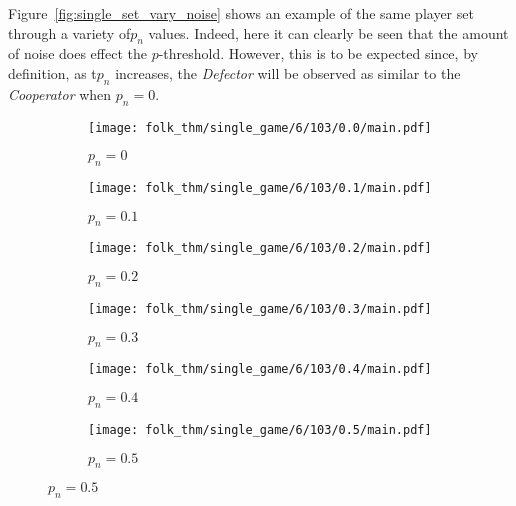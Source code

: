 Figure~\ref{fig:single_set_vary_noise} shows an example of the same player set
through a variety of\(p_{n}\) values. Indeed, here it can clearly be seen that
the amount of
noise does effect the \(p\)-threshold. However, this is to be expected since, by
definition, as t\(p_{n}\) increases, the \textit{Defector} will be observed
as similar to the \textit{Cooperator} when \(p_{n}=0\).

\begin{figure}
    \centering
    \begin{subfigure}{0.45\textwidth}
        \centering
        \texttt{[image: folk\_thm/single\_game/6/103/0.0/main.pdf]}
        \caption{\(p_{n}=0\)}
    \end{subfigure}
    \hspace{3pt}
    \begin{subfigure}{0.45\textwidth}
        \centering
        \texttt{[image: folk\_thm/single\_game/6/103/0.1/main.pdf]}
        \caption{\(p_{n}=0.1\)}
    \end{subfigure}

    \vspace{5pt}

    \begin{subfigure}{0.45\textwidth}
        \centering
        \texttt{[image: folk\_thm/single\_game/6/103/0.2/main.pdf]}
        \caption{\(p_{n}=0.2\)}
    \end{subfigure}
    \hspace{3pt}
    \begin{subfigure}{0.45\textwidth}
        \centering
        \texttt{[image: folk\_thm/single\_game/6/103/0.3/main.pdf]}
        \caption{\(p_{n}=0.3\)}
    \end{subfigure}

    \vspace{5pt}

    \begin{subfigure}{0.45\textwidth}
        \centering
        \texttt{[image: folk\_thm/single\_game/6/103/0.4/main.pdf]}
        \caption{\(p_{n}=0.4\)}
    \end{subfigure}
    \hspace{3pt}
    \begin{subfigure}{0.45\textwidth}
        \centering
        \texttt{[image: folk\_thm/single\_game/6/103/0.5/main.pdf]}
        \caption{\(p_{n}=0.5\)}
    \end{subfigure}


\end{figure}
